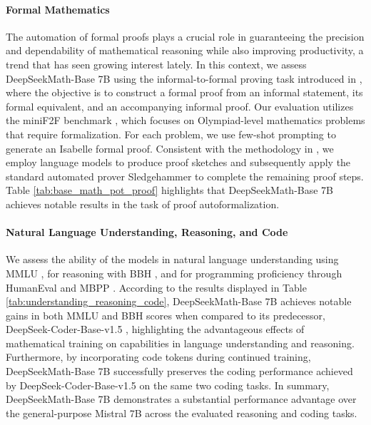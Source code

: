\begin{itemize}[topsep=0pt]
\paragraph{Formal Mathematics}

The automation of formal proofs plays a crucial role in guaranteeing the precision and dependability of mathematical reasoning while also improving productivity, a trend that has seen growing interest lately. In this context, we assess DeepSeekMath-Base 7B using the informal-to-formal proving task introduced in \citep{dsp_proof}, where the objective is to construct a formal proof from an informal statement, its formal equivalent, and an accompanying informal proof. Our evaluation utilizes the miniF2F benchmark \citep{minif2f}, which focuses on Olympiad-level mathematics problems that require formalization. For each problem, we use few-shot prompting to generate an Isabelle formal proof. Consistent with the methodology in \cite{dsp_proof}, we employ language models to produce proof sketches and subsequently apply the standard automated prover Sledgehammer \citep{sledgehammer} to complete the remaining proof steps. Table \ref{tab:base_math_pot_proof} highlights that DeepSeekMath-Base 7B achieves notable results in the task of proof autoformalization.

\paragraph{Natural Language Understanding, Reasoning, and Code}

We assess the ability of the models in natural language understanding using MMLU \citep{mmlu}, for reasoning with BBH \citep{bbh}, and for programming proficiency through HumanEval \citep{codex} and MBPP \citep{mbpp}. According to the results displayed in Table \ref{tab:understanding_reasoning_code}, DeepSeekMath-Base 7B achieves notable gains in both MMLU and BBH scores when compared to its predecessor, DeepSeek-Coder-Base-v1.5 \citep{deepseek-coder}, highlighting the advantageous effects of mathematical training on capabilities in language understanding and reasoning. Furthermore, by incorporating code tokens during continued training, DeepSeekMath-Base 7B successfully preserves the coding performance achieved by DeepSeek-Coder-Base-v1.5 on the same two coding tasks. In summary, DeepSeekMath-Base 7B demonstrates a substantial performance advantage over the general-purpose Mistral 7B \citep{mistral} across the evaluated reasoning and coding tasks.


\end{itemize}
